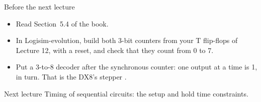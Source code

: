 \documentclass[10pt]{wosm-slides}
\begin{document}
\begin{frame}{Before the next lecture}
  \begin{itemize}
    \item Read Section~5.4 of the book.
    \item In Logisim-evolution, build both 3-bit counters from your T flip-flops
      of Lecture 12, with a reset, and check that they count from 0 to 7.
    \item Put a 3-to-8 decoder  after the synchronous counter: one output
      at a time is 1, in turn. That is the DX8's stepper .
  \end{itemize}

  \begin{block}{Next lecture }
    Timing of sequential circuits: the setup and hold time constraints.
  \end{block}
\end{frame}
\end{document}
